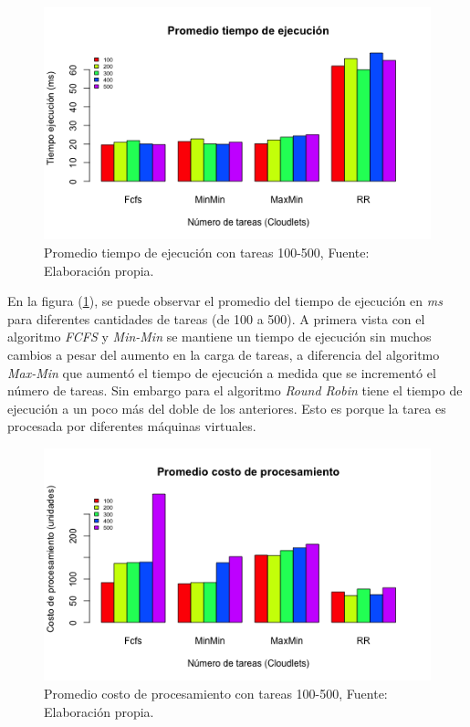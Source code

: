 \documentclass[jou,apacite]{apa6}
\begin{document}
\setcounter{figure}{24}
\renewcommand\thefigure{\arabic{figure}}
\begin{figure}[h!] 
	\centering
	\includegraphics[scale=0.5]{media/tiempoejecucionjpg}
	\caption{Promedio tiempo de ejecuci\'on con tareas 100-500, Fuente: Elaboraci\'on propia.}
	\label{fig:tiempo}
\end{figure}



En la figura (\ref{fig:tiempo}), se puede observar el promedio del tiempo de ejecuci\'on en \emph{ms} para diferentes cantidades de tareas (de 100 a 500). A primera vista con el algoritmo \textit{FCFS} y \textit{Min-Min} se mantiene un tiempo de ejecuci\'on sin muchos cambios a pesar del aumento en la carga de tareas, a diferencia del algoritmo \textit{Max-Min} que aument\'o el tiempo de ejecuci\'on a medida que se increment\'o el n\'umero de tareas. Sin embargo para el algoritmo \textit{Round Robin} tiene el tiempo de ejecución a un poco más del doble de los anteriores. Esto es porque la tarea es procesada por diferentes máquinas virtuales.

\label{etiqueta}

\renewcommand\thefigure{\arabic{figure}}
\begin{figure}[h!] 
	\centering
	\includegraphics[scale=0.5]{media/costoproce}
	\caption{Promedio costo de procesamiento con tareas 100-500, Fuente: Elaboraci\'on propia.}
	\label{fig:costo}
\end{figure}
\end{document}
